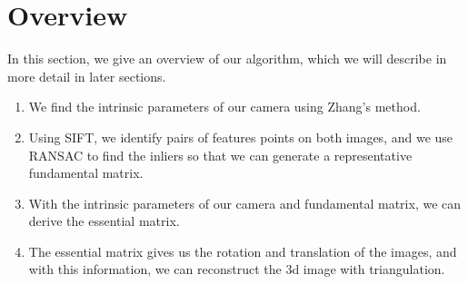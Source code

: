\section{Overview}
\label{s:overview}

In this section, we give an overview of our algorithm, which we will describe in more detail
in later sections.

\begin{enumerate}
\item{We find the intrinsic parameters of our camera using Zhang's method.}
\item{Using SIFT, we identify pairs of features points on both images, and we use RANSAC to find the inliers so that we can generate a representative fundamental matrix.}
\item{With the intrinsic parameters of our camera and fundamental matrix, we can derive the essential matrix.}
\item{The essential matrix gives us the rotation and translation of the images, and with this information, we can reconstruct the 3d image with triangulation.}
\end{enumerate}